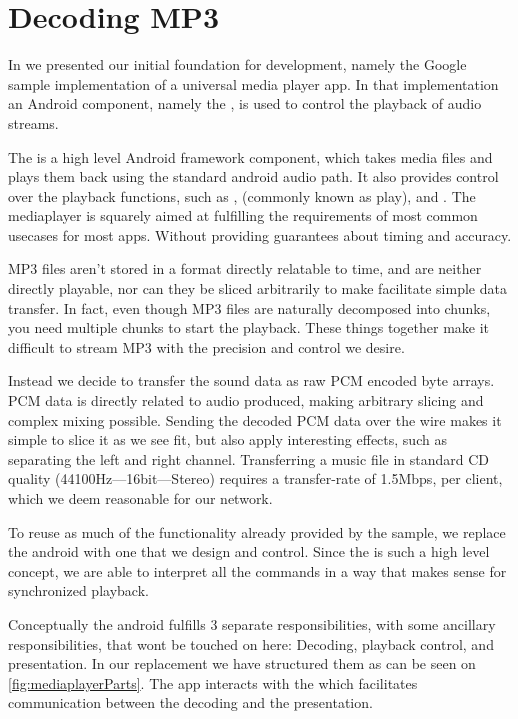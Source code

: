 \section{Decoding MP3}

In  we presented our initial
foundation for development, namely the Google sample implementation of
a universal media player app. In that implementation an Android
component, namely the , is used to
control the playback of audio streams.

The  is a high level Android framework component,
which takes media files and plays them back using the standard android
audio path. It also provides control over the playback functions, such
as ,  (commonly known as play), and
. The mediaplayer is squarely aimed at fulfilling the
requirements of most common usecases for most apps. Without providing
guarantees about timing and accuracy.

MP3 files aren't stored in a format directly relatable to time, and are
neither directly playable, nor can they be sliced arbitrarily to make
facilitate simple data transfer. In fact, even though MP3 files are
naturally decomposed into chunks, you need multiple chunks to start the
playback. These things together make it difficult to stream MP3 with the
precision and control we desire.

Instead we decide to transfer the sound data as raw \ac{PCM} encoded
byte arrays. \ac{PCM} data is directly related to audio produced, making
arbitrary slicing and complex mixing possible. Sending the decoded
\ac{PCM} data over the wire makes it simple to slice it as we see fit,
but also apply interesting effects, such as separating the left and
right channel. Transferring a music file in standard CD quality
(44100Hz---16bit---Stereo) requires a transfer-rate of 1.5Mbps, per
client, which we deem reasonable for our network.

To reuse as much of the functionality already provided by the sample, we
replace the android  with one that we design and
control. Since the  is such a high level concept, we
are able to interpret all the commands in a way that makes sense for
synchronized playback.

Conceptually the android  fulfills 3 separate
responsibilities, with some ancillary responsibilities, that wont be
touched on here: Decoding, playback control, and presentation. In our
replacement we have structured them as can be seen on
\cref{fig:mediaplayerParts}. The app interacts with the  which facilitates communication between the decoding and the
presentation.


